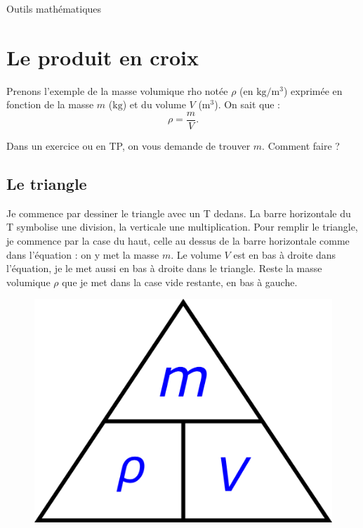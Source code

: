



\begin{header}
Outils mathématiques
\end{header}

\section*{Le produit en croix}

Prenons l'exemple de la masse volumique \og rho \fg{} notée $\rho$ (en $\mathrm{kg/m^3}$) exprimée en fonction de la masse $m$ ($\mathrm{kg}$) et du volume $V$ ($\mathrm{m^3}$).
On sait que :
\begin{equation}
\rho = \frac{m}{V}.
\nonumber
\end{equation}

Dans un exercice ou en TP, on vous demande de trouver $m$.
Comment faire ?


\subsection*{Le triangle}

\begin{conseil}
Je commence par dessiner le triangle avec un T dedans.
La barre horizontale du T symbolise une division, la verticale une multiplication.
Pour remplir le triangle, je commence par la case du haut, celle au dessus de la barre horizontale comme dans l'équation : on y met la masse $m$.
Le volume $V$ est en bas à droite dans l'équation, je le met aussi en bas à droite dans le triangle.
Reste la masse volumique $\rho$ que je met dans la case vide restante, en bas à gauche.
\end{conseil}

\begin{figure}[h]
\center
\includegraphics[scale=0.5]{images/pyramide_fraction.png}
\end{figure}

